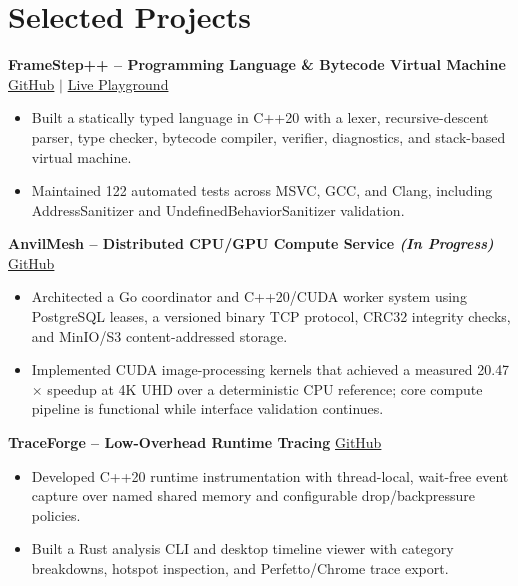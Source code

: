 \documentclass[10pt,letterpaper]{article}
\begin{document}
\section*{Selected Projects}

\textbf{FrameStep++ -- Programming Language \& Bytecode Virtual Machine}
\hfill
\href{https://github.com/Rowrow620/Framestepp}{GitHub}
$|$
\href{https://rowrow620.github.io/Framestepp/}{Live Playground}
\begin{itemize}
    \item Built a statically typed language in C++20 with a lexer, recursive-descent parser, type checker, bytecode compiler, verifier, diagnostics, and stack-based virtual machine.
    \item Maintained 122 automated tests across MSVC, GCC, and Clang, including AddressSanitizer and UndefinedBehaviorSanitizer validation.
\end{itemize}

\vspace{3pt}
\textbf{AnvilMesh -- Distributed CPU/GPU Compute Service \textit{(In Progress)}}
\hfill
\href{https://github.com/Rowrow620/AnvilMesh}{GitHub}
\begin{itemize}
    \item Architected a Go coordinator and C++20/CUDA worker system using PostgreSQL leases, a versioned binary TCP protocol, CRC32 integrity checks, and MinIO/S3 content-addressed storage.
    \item Implemented CUDA image-processing kernels that achieved a measured 20.47$\times$ speedup at 4K UHD over a deterministic CPU reference; core compute pipeline is functional while interface validation continues.
\end{itemize}

\vspace{3pt}
\textbf{TraceForge -- Low-Overhead Runtime Tracing}
\hfill
\href{https://github.com/Rowrow620/TraceForge}{GitHub}
\begin{itemize}
    \item Developed C++20 runtime instrumentation with thread-local, wait-free event capture over named shared memory and configurable drop/backpressure policies.
    \item Built a Rust analysis CLI and desktop timeline viewer with category breakdowns, hotspot inspection, and Perfetto/Chrome trace export.
\end{itemize}
\end{document}
